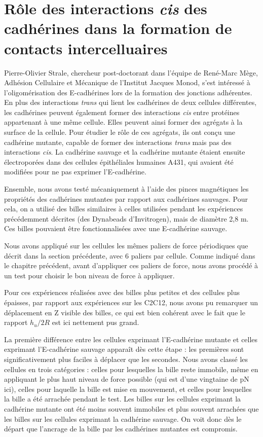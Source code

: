  
 \section{Rôle des interactions \textit{cis} des cadhérines dans la formation de contacts intercelluaires}
 
 Pierre-Olivier Strale, chercheur post-doctorant dans l'équipe de René-Marc Mège, Adhésion Cellulaire et Mécanique de l'Institut Jacques Monod, s'est intéressé à l'oligomérisation des E-cadhérines lors de la formation des jonctions adhérentes. En plus des interactions \textit{trans} qui lient les cadhérines de deux cellules différentes, les cadhérines peuvent également former des interactions \textit{cis} entre protéines appartenant à une même cellule. Elles peuvent ainsi former des agrégats à la surface de la cellule. Pour étudier le rôle de ces agrégats, ils ont conçu une cadhérine mutante, capable de former des interactions \textit{trans} mais pas des interactions \textit{cis}. La cadhérine sauvage et la cadhérine mutante étaient ensuite électroporées dans des cellules épithéliales humaines A431, qui avaient été modifiées pour ne pas exprimer l'E-cadhérine.  
 
 Ensemble, nous avons testé mécaniquement à l'aide des pinces magnétiques les propriétés des cadhérines mutantes par rapport aux cadhérines sauvages. Pour cela, on a utilisé des billes similaires à celles utilisées pendant les expériences précédemment décrites (des Dynabeads d'Invitrogen), mais de diamètre 2,8 \micro m. Ces billes pouvaient être fonctionnalisées avec une E-cadhérine sauvage. 
 
 Nous avons appliqué sur les cellules les mêmes paliers de force périodiques que décrit dans la section précédente, avec 6 paliers par cellule. Comme indiqué dans le chapitre précédent, avant d'appliquer ces paliers de force, nous avons procédé à un test pour choisir le bon niveau de force à appliquer. 

 Pour ces expériences réalisées avec des billes plus petites et des cellules plus épaisses, par rapport aux expériences sur les C2C12, nous avons pu remarquer un déplacement en Z visible des billes, ce qui est bien cohérent avec le fait que le rapport $h_u/2R$ est ici nettement pus grand.
 
 La première différence entre les cellules exprimant l'E-cadhérine mutante et celles exprimant l'E-cadhérine sauvage apparaît dès cette étape : les premières  sont significativement plus faciles à déplacer que les secondes. Nous avons classé les cellules en trois catégories : celles pour lesquelles la bille reste immobile, même en appliquant le plus haut niveau de force possible (qui est d'une vingtaine de pN ici), celles pour laquelle la bille est mise en mouvement, et celles pour lesquelles la bille a été arrachée pendant le test. Les billes sur les cellules exprimant la cadhérine mutante ont été moins souvent immobiles et plus souvent arrachées que les billes sur les cellules exprimant la cadhérine sauvage. On voit donc dès le départ que l'ancrage de la bille par les cadhérines mutantes est compromis. 
 
